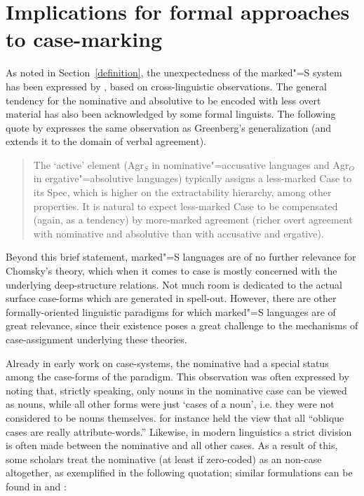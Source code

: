 \section{Implications for formal approaches to case-marking}\label{theoretical}

As noted in Section~\ref{definition}, the unexpectedness of the marked"=S system has been expressed by \citet{Greenberg:1963}, based on cross-linguistic observations.
The general tendency for the nominative and absolutive to be encoded with less overt material has also been acknowledged by some formal linguists.
The following quote by \citet{Chomsky:1993} expresses the same observation as Greenberg's generalization (and extends it to the domain of verbal agreement).
  
\begin{quote}
The `active' element (Agr$_{S}$ in nominative"=accusative languages and Agr$_{O}$ in ergative"=absolutive languages) typically assigns a less-marked Case to its Spec, which is higher on the extractability hierarchy, among other properties. It is natural to expect less-marked Case to be compensated (again, as a tendency) by more-marked agreement (richer overt agreement with nominative and absolutive than with accusative and ergative). 
\citep[10]{Chomsky:1993}
\end{quote}

Beyond this brief statement, marked"=S languages are of no further relevance for Chomsky's theory, which when it comes to case is mostly concerned with the underlying deep-structure relations. 
Not much room is dedicated to the actual surface case-forms which are generated in spell-out. 
However, there are other formally-oriented linguistic paradigms for which marked"=S languages are of great relevance, since their existence poses a great challenge to the mechanisms of case-assignment underlying these theories.

Already in early work on case-systems, the nominative had a special status among the case-forms of the paradigm. 
This observation was often expressed by noting that, strictly speaking, only nouns in the nominative case can be viewed as nouns, while all other forms were just `cases of a noun', i.e. they were not considered to be nouns themselves. 
\citet[24]{Sweet:1876} for instance held the view that all ``oblique cases are really attribute-words.''
Likewise, in modern linguistics a strict division is  often made between the nominative and all other cases. 
As a result of this, some scholars treat the nominative (at least if zero-coded) as an non-case altogether, as exemplified in the following quotation; similar formulations can be found in \citet{Aissen:1999,Aissen:2003} and \citet[566]{deHoop:2008}:
 
